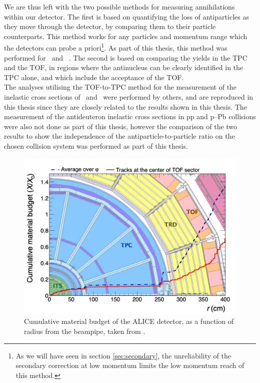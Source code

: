 We are thus left with the two possible methods for measuring annihilations within our detector. The first is based on quantifying the loss of antiparticles as they move through the detector, by comparing them to their particle counterparts. This method works for any particles and momentum range which the detectors can probe a priori\footnote{As we will have seen in section \ref{sec:secondary}, the unreliability of the secondary correction at low momentum limits the low momentum reach of this method.}. As part of this thesis, this method was performed for \ahe\ and \atrit\ . The second is based on comparing the yields in the TPC and the TOF, in regions where the antinucleus can be clearly identified in the TPC alone, and which include the acceptance of the TOF. \\

The analyses utilising the TOF-to-TPC method for the measurement of the inelastic cross sections of \ahe\ and \atrit\ were performed by others, and are reproduced in this thesis since they are closely related to the results shown in this thesis. The measurement of the antideuteron inelastic cross sections in pp and p--Pb collisions were also not done as part of this thesis, however the comparison of the two results to show the independence of the antiparticle-to-particle ratio on the chosen collision system was performed as part of this thesis. 

\begin{figure}
		\centering
		\includegraphics[width=\textwidth]{figures/alice-material_0.png}
		\caption{Cumulative material budget of the ALICE detector, as a function of radius from the beampipe, taken from \cite{antideuteronXS}.}
		\label{fig:ALICE_detector_material_budget}
\end{figure}    


